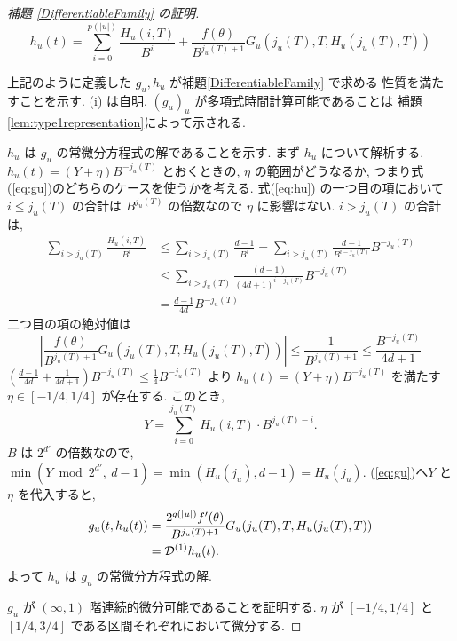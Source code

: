 \begin{proof}[\rm 補題 \ref{DifferentiableFamily} の証明]
 \begin{equation} 
  h_u(t) = \sum^{p(|u|)}_{i=0} \frac{H_u(i, T)}{B^i}  
  + \frac{f(\theta)}{B^{j_u(T)+1}} G_u(j_u(T), T, H_u(j_u(T), T)) 
  \label{eq:hu}
 \end{equation}

 上記のように定義した $g_u, h_u$ が補題\ref{DifferentiableFamily} で求める
 性質を満たすことを示す. (i) は自明. 
 $(g_u)_u$ が多項式時間計算可能であることは
 補題 \ref{lem:type1representation}によって示される.

 $h_u$ は $g_u$ の常微分方程式の解であることを示す.
 まず $h_u$ について解析する. 
  $h_u(t) = (Y + \eta) B^{-j_u(T)}$ とおくときの, $\eta$ の範囲がどうなるか,
  つまり式(\ref{eq:gu})のどちらのケースを使うかを考える.
  式(\ref{eq:hu}) の一つ目の項において
 $i \le j_u(T)$ の合計は $B^{j_u(T)}$ の倍数なので $\eta$ に影響はない.
  $i > j_u(T)$ の合計は, 
 \begin{align*}
  \sum_{i>j_u(T)} \frac{H_u(i, T)}{B^i} 
  & \le \sum_{i>j_u(T)} \frac{d-1}{B^i} 
   = \sum_{i>j_u(T)} \frac{d-1}{B^{i-j_u(T)}}B^{-j_u(T)} \\
  & \le \sum_{i>j_u(T)} \frac{(d-1)}{(4d+1)^{i-j_u(T)}}B^{-j_u(T)} \\
  & = \frac{d-1}{4d}B^{-j_u(T)}
 \end{align*}
 二つ目の項の絶対値は
 \begin{equation}
  \left| \frac{f(\theta)}{B^{j_u(T)+1}} G_u(j_u(T), T, H_u(j_u(T), T)) \right|
  \le \frac{1}{B^{j_u(T)+1}}
  \le \frac{B^{-j_u(T)}}{4d+1}
 \end{equation}
 $(\frac{d-1}{4d} + \frac{1}{4d+1})B^{-j_u(T)} \le \frac 1 4 B^{-j_u(T)} $
  より $h_u(t) = (Y + \eta) B^{-j_u(T)}$ を満たす $\eta \in [-1/4, 1/4]$
 が存在する. このとき,
 \begin{equation}
  Y = \sum_{i=0}^{j_u(T)}H_u(i, T) \cdot B^{j_u(T) - i} .
 \end{equation}
 $B$ は $2^{d'}$ の倍数なので, 
 $\min (Y \bmod 2^{d'}\!\!\!,\ d-1) = \min (H_u(j_u), d-1) = H_u(j_u)$. 
 (\ref{eq:gu})へ$Y$ と $\eta$ を代入すると,
 \begin{align*}
   g_u(t, h_u(t)) 
  & =  \frac{2^{q(|u|)} f'(\theta)}{B^{j_u(T)+1}}
   G_u(j_u(T), T, H_u(j_u(T), T)) \\
  & =  \mathcal D^{(1)}h_u(t).
 \end{align*}
 よって $h_u$ は $g_u$ の常微分方程式の解.

  $g_u$ が $(\infty, 1)$ 階連続的微分可能であることを証明する.
  $\eta$ が $[-1/4, 1/4]$ と $[1/4, 3/4]$ である区間それぞれにおいて微分する.


\end{proof}
